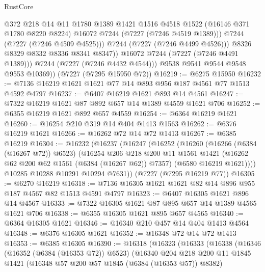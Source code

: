 \begin{lexlean}{RustCore}
\begin{coremodule}
                      @372
                      @218
                      @14
                      @11
                      @1780
                      @1389
                      @1421
                      @1516
                      @4518
                      @1522
                      (@16146 @371 @1780 @8220 @8224)
                      @16072
                      @7244
                      (@7227 (@7246 @4519 @1389)))
                    @7244
                    (@7227 (@7246 @4509 @4525)))
                  @7244
                  (@7227 (@7246 @4499 @4526)))
                @8326
                @8329
                @8332
                @8336
                @8341
                @8347))
            @16072
            @7244
            (@7227 (@7246 @4491 @1389)))
          @7244
          (@7227 (@7246 @4432 @4544)))
        @9538
        @9541
        @9544
        @9548
        @9553
        @10369))
    (@7227 (@7295 @15950 @72))
@16219 := @6275 @15950
@16232 := @7136 @16219 @1621 @1621 @77 @14 @893 @956 @187 @4561 @77 @1513 @4592 @4797
@16237 := @6407 @16219 @1621 @893 @14 @4561
@16247 := @7322 @16219 @1621 @87 @892 @657 @14 @1389 @4559 @1621 @706
@16252 := @6355 @16219 @1621 @892 @657 @4559
@16254 := @6364 @16219 @1621
@16260 := @16254 @210 @319 @14 @404 @1413 @1563
@16262 := @6376 @16219 @1621
@16266 := @16262 @72 @14 @72 @1413
@16267 := @6385 @16219
@16304 := @16232
    (@16237
      (@16247
        (@16252
          (@16260
            (@16266 (@6384 (@16267 @72)) @6523)
            (@16254
              @206
              @218
              @200
              @11
              @1561
              @1421
              (@16262 @62 @200 @62 @1561 (@6384 (@16267 @62)) @7357)
              (@6580 @16219 @1621))))
        @10285
        @10288
        @10291
        @10294
        @7631))
    (@7227 (@7295 @16219 @77))
@16305 := @6270 @16219
@16318 := @7136 @16305 @1621 @1621 @82 @14 @896 @955 @187 @4567 @82 @1513 @4591 @4797
@16323 := @6407 @16305 @1621 @896 @14 @4567
@16333 := @7322 @16305 @1621 @87 @895 @657 @14 @1389 @4565 @1621 @706
@16338 := @6355 @16305 @1621 @895 @657 @4565
@16340 := @6364 @16305 @1621
@16346 := @16340 @210 @457 @14 @404 @1413 @4564
@16348 := @6376 @16305 @1621
@16352 := @16348 @72 @14 @72 @1413
@16353 := @6385 @16305
@16390 := @16318
    (@16323
      (@16333
        (@16338
          (@16346
            (@16352 (@6384 (@16353 @72)) @6523)
            (@16340
              @204
              @218
              @200
              @11
              @1845
              @1421
              (@16348 @57 @200 @57 @1845 (@6384 (@16353 @57)) @8382)

\end{coremodule}
\end{lexlean}
